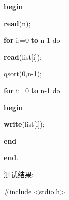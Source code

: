 \documentclass[]{ctexart}
\newenvironment{Shaded}{}{}
\newcommand{\DecValTok}[1]{\textcolor[rgb]{0.25,0.63,0.44}{#1}}
\newcommand{\ImportTok}[1]{#1}
\newcommand{\KeywordTok}[1]{\textcolor[rgb]{0.00,0.44,0.13}{\textbf{#1}}}
\newcommand{\NormalTok}[1]{#1}
\newcommand{\PreprocessorTok}[1]{\textcolor[rgb]{0.74,0.48,0.00}{#1}}
\begin{document}
\begin{Shaded}
\begin{Highlighting}[]
\KeywordTok{begin}

	\KeywordTok{read}\NormalTok{(n);
}
	\KeywordTok{for}\NormalTok{ i:=}\DecValTok{0} \KeywordTok{to}\NormalTok{ n}\DecValTok{-1}\NormalTok{ do
}
		\KeywordTok{read}\NormalTok{(list[i]);
}
\NormalTok{	qsort(}\DecValTok{0}\NormalTok{,n}\DecValTok{-1}\NormalTok{);
}
        \KeywordTok{for}\NormalTok{ i:=}\DecValTok{0} \KeywordTok{to}\NormalTok{ n}\DecValTok{-1}\NormalTok{ do
}
        \KeywordTok{begin}

            \KeywordTok{write}\NormalTok{(list[i]);
}
        \KeywordTok{end}

\KeywordTok{end}\NormalTok{.
}
\end{Highlighting}
\end{Shaded}

测试结果:

\begin{Shaded}
\begin{Highlighting}[]
\PreprocessorTok{#include }\ImportTok{<stdio.h>}\PreprocessorTok{
}



\end{Highlighting}
\end{Shaded}
\end{document}
